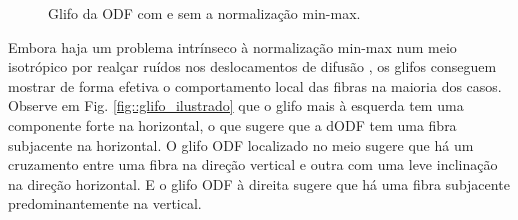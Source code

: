 \documentclass[
    12pt,                %
    oneside,            %
    a4paper,            %
    english,            %
    french,                %
    spanish,            %
    brazil                %
    ]{abntex2}
\begin{document}

\begin{figure}[ht]
\centering
\captionsetup[subfloat]{farskip=0pt,nearskip=0pt}
\centering
    \hspace{1em}
     \caption{Glifo da ODF com e sem a normalização min-max. %
     }
    \label{fig::normalizacao_min_max}
\end{figure}

Embora haja um problema intrínseco à normalização min-max num meio isotrópico por realçar ruídos nos deslocamentos de difusão \cite{TuchQBall2004}, os glifos conseguem mostrar de forma efetiva o comportamento local das fibras na maioria dos casos.
Observe em Fig. \ref{fig::glifo_ilustrado} que o glifo mais à esquerda tem uma componente forte na horizontal, o que sugere que a dODF tem uma fibra subjacente na horizontal. O glifo ODF localizado no meio sugere que há um cruzamento entre uma fibra na direção vertical e outra com uma leve inclinação na direção horizontal. E o glifo ODF à direita sugere que há uma fibra subjacente predominantemente na vertical.
\end{document}
